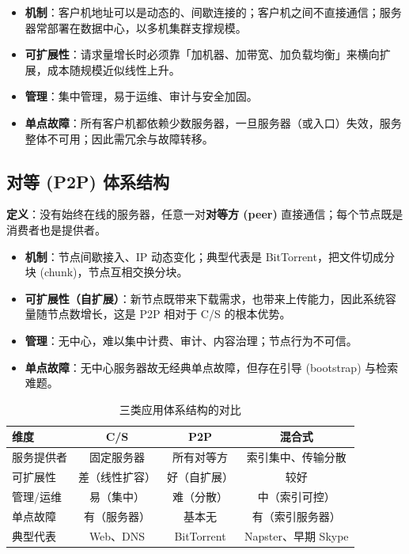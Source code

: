 \begin{itemize}
    \item \textbf{机制}：客户机地址可以是动态的、间歇连接的；客户机之间不直接通信；服务器常部署在数据中心，以多机集群支撑规模。
    \item \textbf{可扩展性}：请求量增长时必须靠「加机器、加带宽、加负载均衡」来横向扩展，成本随规模近似线性上升。
    \item \textbf{管理}：集中管理，易于运维、审计与安全加固。
    \item \textbf{单点故障}：所有客户机都依赖少数服务器，一旦服务器（或入口）失效，服务整体不可用；因此需冗余与故障转移。
\end{itemize}

\subsection{对等 (P2P) 体系结构}

\textbf{定义}：没有始终在线的服务器，任意一对\textbf{对等方 (peer)} 直接通信；每个节点既是消费者也是提供者。

\begin{itemize}
    \item \textbf{机制}：节点间歇接入、IP 动态变化；典型代表是 BitTorrent，把文件切成分块 (chunk)，节点互相交换分块。
    \item \textbf{可扩展性（自扩展）}：新节点既带来下载需求，也带来上传能力，因此系统容量随节点数增长，这是 P2P 相对于 C/S 的根本优势。
    \item \textbf{管理}：无中心，难以集中计费、审计、内容治理；节点行为不可信。
    \item \textbf{单点故障}：无中心服务器故无经典单点故障，但存在引导 (bootstrap) 与检索难题。
\end{itemize}

\begin{table}[H]
\centering
\caption{三类应用体系结构的对比}
\begin{tabulary}{\textwidth}{@{}LCCC@{}}
\toprule
\textbf{维度} & \textbf{C/S} & \textbf{P2P} & \textbf{混合式} \\
\midrule
服务提供者 & 固定服务器 & 所有对等方 & 索引集中、传输分散 \\
可扩展性 & 差（线性扩容） & 好（自扩展） & 较好 \\
管理/运维 & 易（集中） & 难（分散） & 中（索引可控） \\
单点故障 & 有（服务器） & 基本无 & 有（索引服务器） \\
典型代表 & Web、DNS & BitTorrent & Napster、早期 Skype \\
\bottomrule
\end{tabulary}
\end{table}

